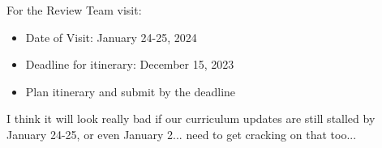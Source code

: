 \documentclass[12pt]{article}
\begin{document}
\noindent
For the Review Team visit:
\begin{itemize}
\item Date of Visit: January 24-25, 2024
\item Deadline for itinerary:  December 15, 2023  
\item Plan itinerary and submit by the deadline
\end{itemize}

I think it will look really bad if our curriculum updates are still stalled by January 24-25, or even January 2... need to get cracking on that too...
\end{document}
